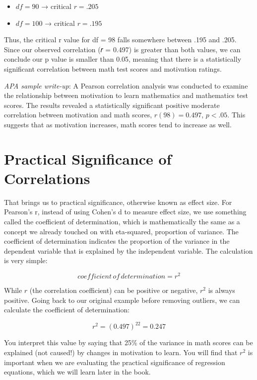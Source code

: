 \documentclass[
  letterpaper,
  DIV=11,
  numbers=noendperiod]{scrreprt}
\begin{document}
\begin{itemize}
\item
  \(df = 90\) → critical \(r = .205\)
\item
  \(df = 100\) → critical \(r = .195\)
\end{itemize}

Thus, the critical r value for df = 98 falls somewhere between .195 and
.205. Since our observed correlation (𝑟 = 0.497) is greater than both
values, we can conclude our p value is smaller than 0.05, meaning that
there is a statistically significant correlation between math test
scores and motivation ratings.

\emph{APA sample write-up}: A Pearson correlation analysis was conducted
to examine the relationship between motivation to learn mathematics and
mathematics test scores. The results revealed a statistically
significant positive moderate correlation between motivation and math
scores, \(r(98) = 0.497\), \(p < .05\). This suggests that as motivation
increases, math scores tend to increase as well.

\section{Practical Significance of
Correlations}\label{practical-significance-of-correlations}

That brings us to practical significance, otherwise known as effect
size. For Pearson's r, instead of using Cohen's d to measure effect
size, we use something called the coefficient of determination, which is
mathematically the same as a concept we already touched on with
eta-squared, proportion of variance. The coefficient of determination
indicates the proportion of the variance in the dependent variable that
is explained by the independent variable. The calculation is very
simple:

\[
coefficient \, of \, determination = r^2
 \]

While \(r\) (the correlation coefficient) can be positive or negative,
\(r^2\) is always positive. Going back to our original example before
removing outliers, we can calculate the coefficient of determination:

\[
r^2= (0.497)^22 = 0.247
\]

You interpret this value by saying that 25\% of the variance in math
scores can be explained (not caused!) by changes in motivation to learn.
You will find that \(r^2\) is important when we are evaluating the
practical significance of regression equations, which we will learn
later in the book.
\end{document}
